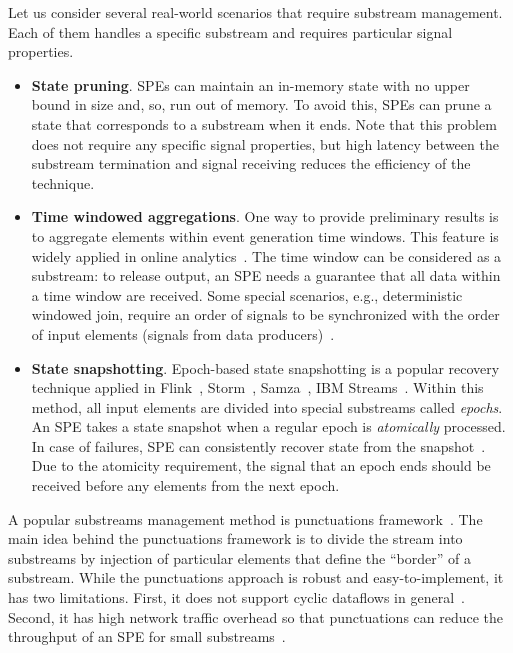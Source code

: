 Let us consider several real-world scenarios that require substream management. Each of them handles a specific substream and requires particular signal properties.
\begin{itemize}
    \item {\bf State pruning}. SPEs can maintain an in-memory state with no upper bound in size and, so, run out of memory. To avoid this, SPEs can prune a state that corresponds to a substream when it ends. Note that this problem does not require any specific signal properties, but high latency between the substream termination and signal receiving reduces the efficiency of the technique.  
    \item {\bf Time windowed aggregations}. One way to provide preliminary results is to aggregate elements within event generation time windows. This feature is widely applied in online analytics~\cite{traub2018scotty}. The time window can be considered as a substream: to release output, an SPE needs a guarantee that all data within a time window are received. Some special scenarios, e.g., deterministic windowed join, require an order of signals to be synchronized with the order of input elements (signals from data producers)~\cite{najdataei2019stretch, gulisano2016scalejoin}.
    \item {\bf State snapshotting}. Epoch-based state snapshotting is a popular recovery technique applied in Flink~\cite{Carbone:2017:SMA:3137765.3137777}, Storm~\cite{Toshniwal:2014:STO:2588555.2595641}, Samza~\cite{Noghabi:2017:SSS:3137765.3137770}, IBM Streams~\cite{jacques2016consistent}. Within this method, all input elements are divided into special substreams called {\em epochs}. An SPE takes a state snapshot when a regular epoch is {\em atomically} processed. In case of failures, SPE can consistently recover state from the snapshot~\cite{2015arXiv150608603C}. Due to the atomicity requirement, the signal that an epoch ends should be received before any elements from the next epoch. 
\end{itemize}

A popular substreams management method is punctuations framework~\cite{tucker2003exploiting}. The main idea behind the punctuations framework is to divide the stream into substreams by injection of particular elements that define the ``border'' of a substream. While the punctuations approach is robust and easy-to-implement, it has two limitations. First, it does not support cyclic dataflows in general~\cite{carbone2018scalable}. Second, it has high network traffic overhead so that punctuations can reduce the throughput of an SPE for small substreams~\cite{Li:2008:OPN:1453856.1453890}. 

